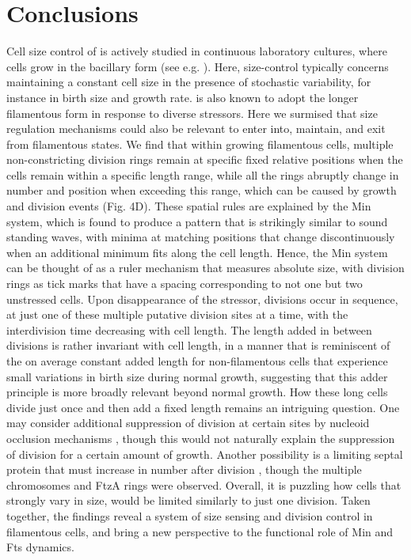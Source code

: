 \section{Conclusions}
Cell size control of \ecoli is actively studied in continuous laboratory cultures, where cells grow in the bacillary form (see e.g. \cite{Marshall2012, Jorgensen2004, Robert2015, Chien2012, Turner2012, Wallden2016, Taheri-Araghi2014, Campos2014, Osella2014}). Here, size-control typically concerns maintaining a constant cell size in the presence of stochastic variability, for instance in birth size and growth rate. \ecoli is also known to adopt the longer filamentous form in response to diverse stressors. Here we surmised that size regulation mechanisms could also be relevant to enter into, maintain, and exit from filamentous states. We find that within growing filamentous cells, multiple non-constricting division rings remain at specific fixed relative positions when the cells remain within a specific length range, while all the rings abruptly change in number and position when exceeding this range, which can be caused by growth and division events (Fig. 4D). These spatial rules are explained by the Min system, which is found to produce a pattern that is strikingly similar to sound standing waves, with minima at matching positions that change discontinuously when an additional minimum fits along the cell length. Hence, the Min system can be thought of as a ruler mechanism that measures absolute size, with division rings as tick marks that have a spacing corresponding to not one but two unstressed cells. Upon disappearance of the stressor, divisions occur in sequence, at just one of these multiple putative division sites at a time, with the interdivision time decreasing with cell length. The length added in between divisions is rather invariant with cell length, in a manner that is reminiscent of the on average constant added length for non-filamentous cells that experience small variations in birth size during normal growth, suggesting that this adder principle is more broadly relevant beyond normal growth. How these long cells divide just once and then add a fixed length remains an intriguing question. One may consider additional suppression of division at certain sites by nucleoid occlusion mechanisms \cite{Wu2011, Mulder1989}, though this would not naturally explain the suppression of division for a certain amount of growth. Another possibility is a limiting septal protein that must increase in number after division \cite{Bi1990}, though the multiple chromosomes and FtzA rings were observed. Overall, it is puzzling how cells that strongly vary in size, would be limited similarly to just one division. Taken together, the findings reveal a system of size sensing and division control in filamentous \ecoli cells, and bring a new perspective to the functional role of Min and Fts dynamics.

